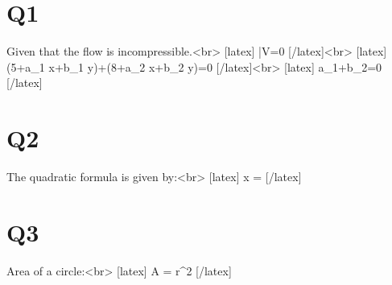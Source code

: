 \section*{Q1}
Given that the flow is incompressible.<br>
[latex] \therefore \quad {} \bar{V}=0 [/latex]<br>
[latex] \left(5+a_{1} x+b_{1} y\right)+\left(8+a_{2} x+b_{2} y\right)=0 [/latex]<br>
[latex] a_{1}+b_{2}=0 [/latex]

\section*{Q2}
The quadratic formula is given by:<br>
[latex] x =  [/latex]

\section*{Q3}
Area of a circle:<br>
[latex] A = \pi r^2 [/latex]
